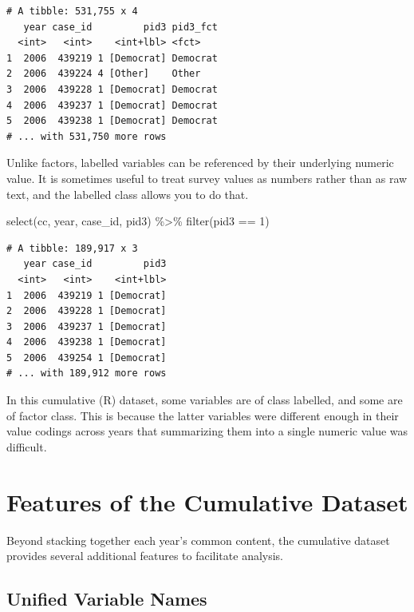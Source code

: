 \documentclass[10pt,article,oneside]{memoir}
\theoremstyle{definition}
\newenvironment{Shaded}{\begin{snugshade}}{\end{snugshade}}
\newcommand{\DecValTok}[1]{\textcolor[rgb]{0.00,0.00,0.81}{#1}}
\newcommand{\FunctionTok}[1]{\textcolor[rgb]{0.00,0.00,0.00}{#1}}
\newcommand{\NormalTok}[1]{#1}
\newcommand{\SpecialCharTok}[1]{\textcolor[rgb]{0.00,0.00,0.00}{#1}}
\begin{document}
\begin{verbatim}
# A tibble: 531,755 x 4
   year case_id         pid3 pid3_fct
  <int>   <int>    <int+lbl> <fct>   
1  2006  439219 1 [Democrat] Democrat
2  2006  439224 4 [Other]    Other   
3  2006  439228 1 [Democrat] Democrat
4  2006  439237 1 [Democrat] Democrat
5  2006  439238 1 [Democrat] Democrat
# ... with 531,750 more rows
\end{verbatim}

\noindent Unlike factors, labelled variables can be referenced by their
underlying numeric value. It is sometimes useful to treat survey values
as numbers rather than as raw text, and the labelled class allows you to
do that.

\begin{Shaded}
\begin{Highlighting}[]
\FunctionTok{select}\NormalTok{(cc, year, case\_id, pid3) }\SpecialCharTok{\%\textgreater{}\%} 
  \FunctionTok{filter}\NormalTok{(pid3 }\SpecialCharTok{==} \DecValTok{1}\NormalTok{)}
\end{Highlighting}
\end{Shaded}

\begin{verbatim}
# A tibble: 189,917 x 3
   year case_id         pid3
  <int>   <int>    <int+lbl>
1  2006  439219 1 [Democrat]
2  2006  439228 1 [Democrat]
3  2006  439237 1 [Democrat]
4  2006  439238 1 [Democrat]
5  2006  439254 1 [Democrat]
# ... with 189,912 more rows
\end{verbatim}

\indent In this cumulative (R) dataset, some variables are of class
labelled, and some are of factor class. This is because the latter
variables were different enough in their value codings across years that
summarizing them into a single numeric value was difficult.

\newpage

\hypertarget{features-of-the-cumulative-dataset}{%
\section{Features of the Cumulative
Dataset}\label{features-of-the-cumulative-dataset}}

Beyond stacking together each year's common content, the cumulative
dataset provides several additional features to facilitate analysis.

\hypertarget{unified-variable-names}{%
\subsection{Unified Variable Names}\label{unified-variable-names}}
\end{document}
